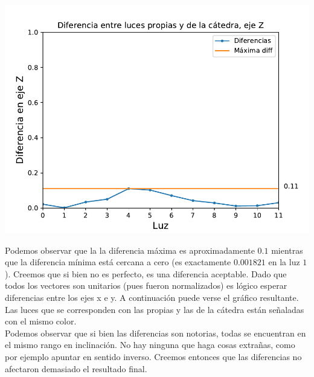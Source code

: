 {\centering
    \includegraphics[scale=0.7]{informe/imagenes/lucesEjezDiferencias.pdf} \\
}

Podemos observar que la la diferencia máxima es aproximadamente $0.1$ mientras que la diferencia mínima está cercana a cero (es exactamente $0.001821$ en la luz $1$). Creemos que si bien no es perfecto, es una diferencia aceptable. Dado que todos los vectores son unitarios (pues fueron normalizados) es lógico esperar diferencias entre los ejes x e y. A continuación puede verse el gráfico resultante. Las luces que se corresponden con las propias y las de la cátedra están señaladas con el mismo color. \\

Podemos observar que si bien las diferencias son notorias, todas se encuentran en el mismo rango en inclinación. No hay ninguna que haga cosas extrañas, como por ejemplo apuntar en sentido inverso. Creemos entonces que las diferencias no afectaron demasiado el resultado final.

